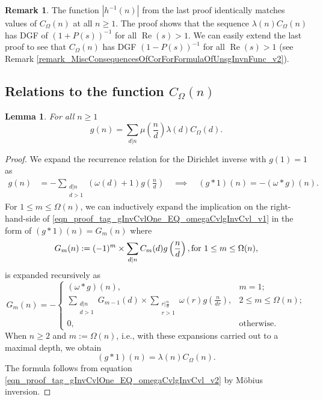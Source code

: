 \documentclass[11pt,reqno,a4letter]{article}
\newcommand{\hlocalref}[1]{\hyperref[#1]{\ref{#1}}}
\numberwithin{equation}{section}
\numberwithin{figure}{section}
\numberwithin{table}{section}
\theoremstyle{plain}
\newtheorem{lemma}[theorem]{Lemma}
\numberwithin{theorem}{section}
\theoremstyle{definition}
\newtheorem{remark}[theorem]{Remark}
\theoremstyle{remark}
\renewcommand{\Re}{\operatorname{Re}}
\newcommand{\mathtext}[1]{\text{\rm #1}}
\begin{document}
\begin{remark}
The function $|h^{-1}(n)|$ from the last proof identically matches  
values of $C_{\Omega}(n)$ at all $n \geq 1$. 
The proof shows that the sequence $\lambda(n) C_{\Omega}(n)$ has 
DGF of $(1 + P(s))^{-1}$ for all $\Re(s) > 1$. We can easily extend the last proof to 
see that $C_{\Omega}(n)$ has DGF $(1-P(s))^{-1}$ for all $\Re(s) > 1$ 
(see Remark \hlocalref{remark_MiscConsequencesOfCorForFormulaOfUnsgInvnFunc_v2}). 
\end{remark}

\subsection{Relations to the function $C_{\Omega}(n)$} 
\label{Section_InvFunc_PreciseExpsAndAsymptotics} 
\label{subSection_Relating_CknFuncs_to_gInvn} 

\begin{lemma} 
\label{lemma_AnExactFormulaFor_gInvByMobiusInv_v1} 
For all $n \geq 1$ 
\[
g(n) = \sum_{d|n} \mu\left(\frac{n}{d}\right) \lambda(d) C_{\Omega}(d). 
\]
\end{lemma}
\begin{proof} 
We expand the recurrence relation for the Dirichlet inverse 
with $g(1) = 1$ as 
\begin{align} 
\label{eqn_proof_tag_gInvCvlOne_EQ_omegaCvlgInvCvl_v1} 
g(n) & = - \sum_{\substack{d|n \\ d>1}} (\omega(d) + 1) g\left(\frac{n}{d}\right) 
     \quad\implies\quad 
     (g \ast 1)(n) = -(\omega \ast g)(n). 
\end{align} 
For $1 \leq m \leq \Omega(n)$, we can inductively expand the 
implication on the right-hand-side of \eqref{eqn_proof_tag_gInvCvlOne_EQ_omegaCvlgInvCvl_v1} 
in the form of $(g \ast 1)(n) = G_m(n)$ where 
$$G_m(n) := (-1)^m \times \sum_{d|n} C_m(d) g\left(\frac{n}{d}\right), \mathtext{ for } 1 \leq m \leq \Omega(n),$$ 
is expanded recursively as 
\[
G_m(n) = - 
     \begin{cases} 
     (\omega \ast g)(n), & m = 1; \\ 
     \sum\limits_{\substack{d|n \\ d > 1}} G_{m-1}(d) \times \sum\limits_{\substack{r|\frac{n}{d} \\ r > 1}} 
     \omega(r) g\left(\frac{n}{dr}\right), & 2 \leq m \leq \Omega(n); \\ 
     0, & \text{otherwise.} 
     \end{cases} 
\]
When $n \geq 2$ and $m := \Omega(n)$, i.e., with these expansions 
carried out to a maximal depth, we obtain 
\begin{equation} 
\label{eqn_proof_tag_gInvCvlOne_EQ_omegaCvlgInvCvl_v2} 
(g \ast 1)(n) = \lambda(n) C_{\Omega}(n). 
\end{equation} 
The formula follows from equation \eqref{eqn_proof_tag_gInvCvlOne_EQ_omegaCvlgInvCvl_v2} 
by M\"obius inversion. 
\end{proof} 
\end{document}
